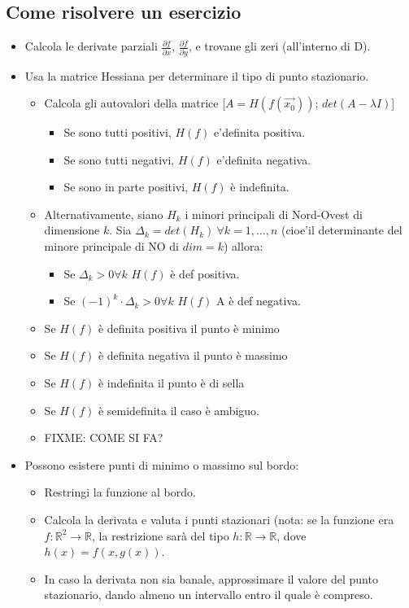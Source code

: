 \documentclass[a4paper,10pt]{book}
\begin{document}
\subsection{Come risolvere un esercizio}
\begin{itemize}
\item Calcola le derivate parziali $\frac{\partial f}{\partial x}$, $\frac{\partial f}{\partial y}$, e trovane gli zeri (all'interno di D).
\item Usa la matrice Hessiana per determinare il tipo di punto stazionario.
\begin{itemize}
 \item Calcola gli autovalori della matrice [$A = H(f(\vec{x_0}))$; $det(A-\lambda I)$]
 \begin{itemize} 
 \item Se sono tutti positivi,  $H(f)$ e'definita positiva.
 \item Se sono tutti negativi,  $H(f)$ e'definita negativa.
 \item Se sono in parte positivi,  $H(f)$ è indefinita.
 \end{itemize} 
 \item Alternativamente, siano $H_k$ i minori principali di Nord-Ovest di dimensione $k$.
Sia $\Delta_k=det(H_k)\ \forall k=1,\dots,n$ (cioe'il determinante del minore principale di NO di $dim=k$) allora:
 \begin{itemize}
  \item Se $\Delta_k > 0 \forall k$ $H(f)$ è def positiva.
  \item Se $(-1)^k\cdot\Delta_k > 0 \forall k$ $H(f)$ A è def negativa.
 \end{itemize}
 

 \item Se $H(f)$ è definita positiva il punto è minimo
 \item Se $H(f)$ è definita negativa il punto è massimo
 \item Se $H(f)$ è indefinita il punto è di sella
 \item Se $H(f)$ è semidefinita il caso è ambiguo.
 
 \item FIXME: COME SI FA?
\end{itemize}
\item Possono esistere punti di minimo o massimo sul bordo:
\begin{itemize}
 \item Restringi la funzione al bordo.
 \item Calcola la derivata e valuta i punti stazionari (nota: se la funzione era $f: \mathbb{R}^2 \rightarrow \mathbb{R}$, la restrizione sarà del tipo $h: \mathbb{R} \rightarrow \mathbb{R}$, dove $h(x) = f(x, g(x))$.
 \item In caso la derivata non sia banale, approssimare il valore del punto stazionario, dando almeno un intervallo entro il quale è compreso.
\end{itemize}
\end{itemize}
\end{document}
